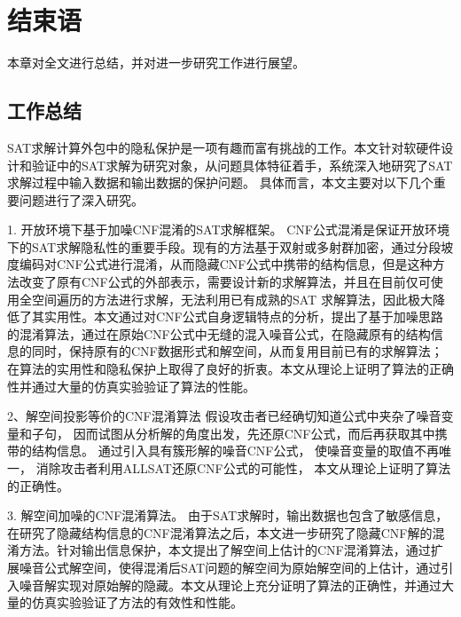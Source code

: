 \chapter{结束语}
\label{chap:7}
本章对全文进行总结，并对进一步研究工作进行展望。
\section{工作总结}
SAT求解计算外包中的隐私保护是一项有趣而富有挑战的工作。本文针对软硬件设计和验证中的SAT求解为研究对象，从问题具体特征着手，系统深入地研究了SAT求解过程中输入数据和输出数据的保护问题。
具体而言，本文主要对以下几个重要问题进行了深入研究。

1. 开放环境下基于加噪CNF混淆的SAT求解框架。
CNF公式混淆是保证开放环境下的SAT求解隐私性的重要手段。现有的方法基于双射或多射群加密，通过分段坡度编码对CNF公式进行混淆，从而隐藏CNF公式中携带的结构信息，但是这种方法改变了原有CNF公式的外部表示，需要设计新的求解算法，并且在目前仅可使用全空间遍历的方法进行求解，无法利用已有成熟的SAT 求解算法，因此极大降低了其实用性。本文通过对CNF公式自身逻辑特点的分析，提出了基于加噪思路的混淆算法，通过在原始CNF公式中无缝的混入噪音公式，在隐藏原有的结构信息的同时，保持原有的CNF数据形式和解空间，从而复用目前已有的求解算法；在算法的实用性和隐私保护上取得了良好的折衷。本文从理论上证明了算法的正确性并通过大量的仿真实验验证了算法的性能。

2、解空间投影等价的CNF混淆算法
假设攻击者已经确切知道公式中夹杂了噪音变量和子句，
因而试图从分析解的角度出发，先还原CNF公式，而后再获取其中携带的结构信息。
通过引入具有簇形解的噪音CNF公式，
使噪音变量的取值不再唯一，
消除攻击者利用ALLSAT还原CNF公式的可能性，
本文从理论上证明了算法的正确性。

3. 解空间加噪的CNF混淆算法。
由于SAT求解时，输出数据也包含了敏感信息，在研究了隐藏结构信息的CNF混淆算法之后，本文进一步研究了隐藏CNF解的混淆方法。针对输出信息保护，本文提出了解空间上估计的CNF混淆算法，通过扩展噪音公式解空间，使得混淆后SAT问题的解空间为原始解空间的上估计，通过引入噪音解实现对原始解的隐藏。本文从理论上充分证明了算法的正确性，并通过大量的仿真实验验证了方法的有效性和性能。


